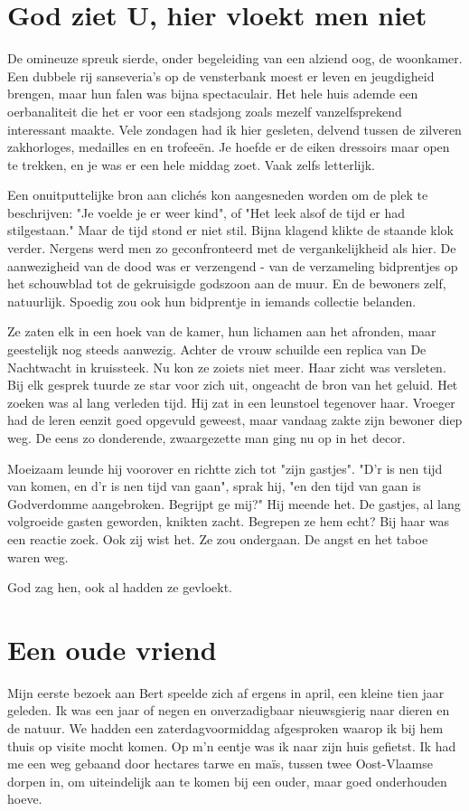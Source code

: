 \documentclass[12pt, justified, a4paper, symmetric]{tufte-book}
\begin{document}
\section{God ziet U, hier vloekt men niet}
De omineuze spreuk sierde, onder begeleiding van een alziend oog, de woonkamer. Een dubbele rij sanseveria's op de vensterbank moest er leven en jeugdigheid brengen, maar hun falen was bijna spectaculair. Het hele huis ademde een oerbanaliteit die het er voor een stadsjong zoals mezelf vanzelfsprekend interessant maakte. Vele zondagen had ik hier gesleten, delvend tussen de zilveren zakhorloges, medailles en en trofee\"en. Je hoefde er de eiken dressoirs maar open te trekken, en je was er een hele middag zoet. Vaak zelfs letterlijk.

Een onuitputtelijke bron aan clich\'es kon aangesneden worden om de plek te beschrijven: "Je voelde je er weer kind", of "Het leek alsof de tijd er had stilgestaan." Maar de tijd stond er niet stil. Bijna klagend klikte de staande klok verder. Nergens werd men zo geconfronteerd met de vergankelijkheid als hier. De aanwezigheid van de dood was er verzengend - van de verzameling bidprentjes op het schouwblad tot de gekruisigde godszoon aan de muur. En de bewoners zelf, natuurlijk. Spoedig zou ook hun bidprentje in iemands collectie belanden.

Ze zaten elk in een hoek van de kamer, hun lichamen aan het afronden, maar geestelijk nog steeds aanwezig. Achter de vrouw schuilde een replica van De Nachtwacht in kruissteek. Nu kon ze zoiets niet meer. Haar zicht was versleten. Bij elk gesprek tuurde ze star voor zich uit, ongeacht de bron van het geluid. Het zoeken was al lang verleden tijd. Hij zat in een leunstoel tegenover haar. Vroeger had de leren eenzit goed opgevuld geweest, maar vandaag zakte zijn bewoner diep weg. De eens zo donderende, zwaargezette man ging nu op in het decor.

Moeizaam leunde hij voorover en richtte zich tot "zijn gastjes". "D'r is nen tijd van komen, en d'r is nen tijd van gaan", sprak hij, "en den tijd van gaan is Godverdomme aangebroken. Begrijpt ge mij?" Hij meende het. De gastjes, al lang volgroeide gasten geworden, knikten zacht. Begrepen ze hem echt? Bij haar was een reactie zoek. Ook zij wist het. Ze zou ondergaan. De angst en het taboe waren weg.

God zag hen, ook al hadden ze gevloekt.

\newpage
\section{Een oude vriend}
Mijn eerste bezoek aan Bert speelde zich af ergens in april, een kleine tien jaar geleden. Ik was een jaar of negen en onverzadigbaar nieuwsgierig naar dieren en de natuur. We hadden een zaterdagvoormiddag afgesproken waarop ik bij hem thuis op visite mocht komen. Op m'n eentje was ik naar zijn huis gefietst. Ik had me een weg gebaand door hectares tarwe en ma\"is, tussen twee Oost-Vlaamse dorpen in, om uiteindelijk aan te komen bij een ouder, maar goed onderhouden hoeve.
\end{document}
